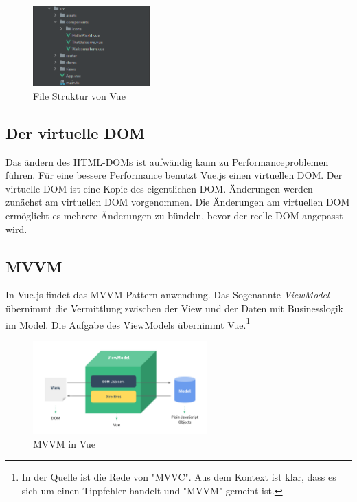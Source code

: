 \begin{figure}[H]
  \centering
  \includegraphics[width=0.4\textwidth]{img/vueFileStructure}
  \caption{File Struktur von Vue}
  \label{fig:vueFileStructure}
\end{figure}

\subsection*{Der virtuelle DOM}
Das ändern des HTML-DOMs ist aufwändig kann zu Performanceproblemen führen.
Für eine bessere Performance benutzt Vue.js einen virtuellen DOM.
Der virtuelle DOM ist eine Kopie des eigentlichen DOM.
Änderungen werden zunächst am virtuellen DOM vorgenommen.
Die Änderungen am virtuellen DOM ermöglicht es mehrere Änderungen zu bündeln,
bevor der reelle DOM angepasst wird. \cite[S. 10-11]{steyer2019} %

\subsection*{MVVM}
In Vue.js findet das MVVM-Pattern anwendung.
Das Sogenannte \emph{ViewModel} übernimmt die Vermittlung zwischen der View
und der Daten mit Businesslogik im Model.
Die Aufgabe des ViewModels übernimmt Vue.\cite[S. 43]{steyer2019}\footnote{In der Quelle ist die Rede von "MVVC". Aus dem Kontext ist klar, dass es sich um einen Tippfehler handelt und "MVVM" gemeint ist.}

\begin{figure}[H]
  \centering
  \includegraphics[width=0.6\textwidth]{img/mvvm}
  \caption{MVVM in Vue \cite{gettingStarted012}}
  \label{fig:mvvm}
\end{figure}

